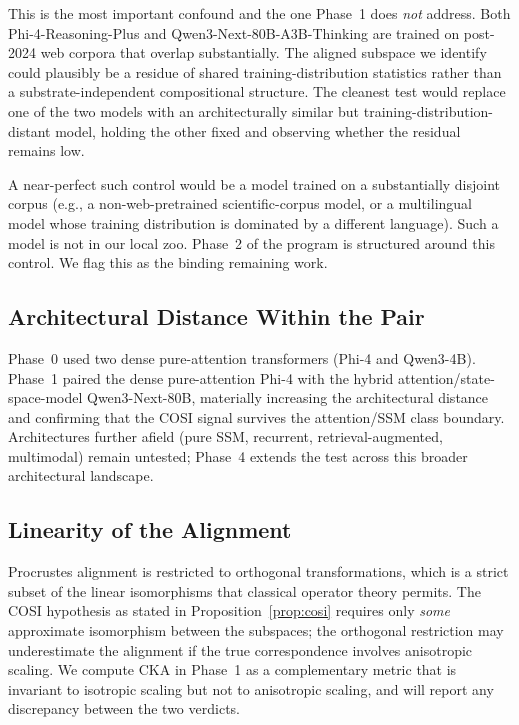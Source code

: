 This is the most important confound and the one Phase~1 does \emph{not}
address. Both Phi-4-Reasoning-Plus and Qwen3-Next-80B-A3B-Thinking are
trained on post-2024 web corpora that overlap substantially. The
aligned subspace we identify could plausibly be a residue of shared
training-distribution statistics rather than a substrate-independent
compositional structure. The cleanest test would replace one of the two
models with an architecturally similar but training-distribution-distant
model, holding the other fixed and observing whether the residual
remains low.

A near-perfect such control would be a model trained on a substantially
disjoint corpus (e.g., a non-web-pretrained scientific-corpus model, or a
multilingual model whose training distribution is dominated by a different
language). Such a model is not in our local zoo. Phase~2 of the program
is structured around this control. We flag this as the binding remaining
work.

\subsection{Architectural Distance Within the Pair}

Phase~0 used two dense pure-attention transformers (Phi-4 and Qwen3-4B).
Phase~1 paired the dense pure-attention Phi-4 with the hybrid
attention/state-space-model Qwen3-Next-80B, materially increasing the
architectural distance and confirming that the COSI signal survives the
attention/SSM class boundary. Architectures further afield (pure SSM,
recurrent, retrieval-augmented, multimodal) remain untested; Phase~4
extends the test across this broader architectural landscape.

\subsection{Linearity of the Alignment}

Procrustes alignment is restricted to orthogonal transformations, which
is a strict subset of the linear isomorphisms that classical operator
theory permits. The COSI hypothesis as stated in
Proposition~\ref{prop:cosi} requires only \emph{some} approximate
isomorphism between the subspaces; the orthogonal restriction may
underestimate the alignment if the true correspondence involves
anisotropic scaling. We compute CKA in Phase~1 as a complementary metric
that is invariant to isotropic scaling but not to anisotropic scaling, and
will report any discrepancy between the two verdicts.

